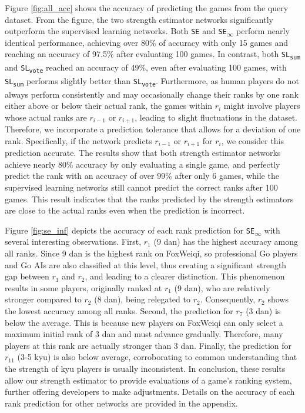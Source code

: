 Figure \ref{fig:all_acc} shows the accuracy of predicting the games from the query dataset.
From the figure, the two strength estimator networks significantly outperform the supervised learning networks.
Both \texttt{SE} and \texttt{SE\textsubscript{$\infty$}} perform nearly identical performance, achieving over 80\% of accuracy with only 15 games and reaching an accuracy of 97.5\% after evaluating 100 games.
In contrast, both \texttt{SL\textsubscript{sum}} and \texttt{SL\textsubscript{vote}} reached an accuracy of 49\%, even after evaluating 100 games, with \texttt{SL\textsubscript{sum}} performs slightly better than \texttt{SL\textsubscript{vote}}.
Furthermore, as human players do not always perform consistently and may occasionally change their ranks by one rank either above or below their actual rank, the games within $r_i$ might involve players whose actual ranks are $r_{i-1}$ or $r_{i+1}$, leading to slight fluctuations in the dataset.
Therefore, we incorporate a prediction tolerance that allows for a deviation of one rank.
Specifically, if the network predicts $r_{i-1}$ or $r_{i+1}$ for $r_i$, we consider this prediction accurate.
The results show that both strength estimator networks achieve nearly 80\% accuracy by only evaluating a single game, and perfectly predict the rank with an accuracy of over 99\% after only 6 games, while the supervised learning networks still cannot predict the correct ranks after 100 games. 
This result indicates that the ranks predicted by the strength estimators are close to the actual ranks even when the prediction is incorrect.

Figure \ref{fig:se_inf} depicts the accuracy of each rank prediction for \texttt{SE\textsubscript{$\infty$}} with several interesting observations.
First, $r_1$ (9 dan) has the highest accuracy among all ranks.
Since 9 dan is the highest rank on FoxWeiqi, so professional Go players and Go AIs are also classified at this level, thus creating a significant strength gap between $r_1$ and $r_2$, and leading to a clearer distinction.
This phenomenon results in some players, originally ranked at $r_1$ (9 dan), who are relatively stronger compared to $r_2$ (8 dan), being relegated to $r_2$.
Consequently, $r_2$ shows the lowest accuracy among all ranks.
Second, the prediction for $r_7$ (3 dan) is below the average.
This is because new players on FoxWeiqi can only select a maximum initial rank of 3 dan and must advance gradually.
Therefore, many players at this rank are actually stronger than 3 dan.
Finally, the prediction for $r_{11}$ (3-5 kyu) is also below average, corroborating to common understanding that the strength of kyu players is usually inconsistent.
In conclusion, these results allow our strength estimator to provide evaluations of a game's ranking system, further offering developers to make adjustments.
Details on the accuracy of each rank prediction for other networks are provided in the appendix.


